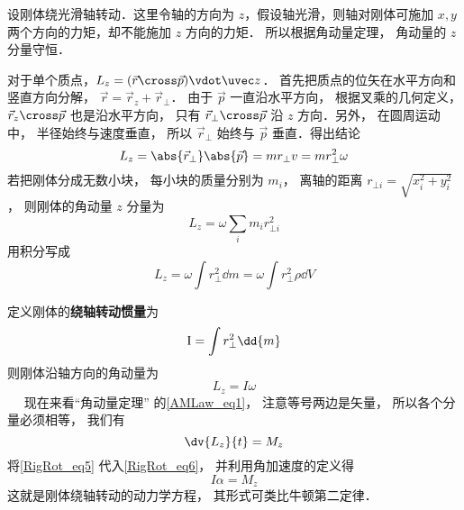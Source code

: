 

设刚体绕光滑轴转动．这里令轴的方向为 $z$，假设轴光滑，则轴对刚体可施加 $x, y$ 两个方向的力矩，却不能施加 $z$ 方向的力矩． 所以根据角动量定理， 角动量的 $z$ 分量守恒．

对于单个质点，$L_z = ( \vec r \cross \vec p ) \vdot \uvec z$． 首先把质点的位矢在水平方向和竖直方向分解， $\vec r = {\vec r_z} + {\vec r_ \bot }$． 由于 $\vec p$ 一直沿水平方向， 根据叉乘的几何定义， ${\vec r_z} \cross \vec p$ 也是沿水平方向， 只有 ${\vec r_ \bot } \cross \vec p$ 沿 $z$ 方向．另外， 在圆周运动中， 半径始终与速度垂直， 所以 ${\vec r_ \bot }$ 始终与 $\vec p$ 垂直．得出结论
\begin{equation}
{L_z} = \abs{\vec r_\bot} \abs{\vec p} = m {r_ \bot } v = mr_ \bot ^2\omega 
\end{equation}
若把刚体分成无数小块， 每小块的质量分别为 $m_i$， 离轴的距离 $r_{\bot i} = \sqrt {x_i^2 + y_i^2} $， 则刚体的角动量 $z$ 分量为
\begin{equation}
L_z = \omega \sum_i m_i r_{ \bot i}^2
\end{equation}
用积分写成
\begin{equation}
{L_z} = \omega \int r_ \bot ^2 \dd{m} = \omega \int r_ \bot ^2\rho  \dd{V} 
\end{equation}

定义刚体的\textbf{绕轴转动惯量}为
\begin{equation}
{\rm{I}} = \int r_ \bot ^2 \dd{m} 
\end{equation}
则刚体沿轴方向的角动量为
\begin{equation}\label{RigRot_eq5}
{L_z} = I\omega 
\end{equation}
 
现在来看“角动量定理” 的\autoref{AMLaw_eq1}， 注意等号两边是矢量， 所以各个分量必须相等， 我们有
\begin{equation}\label{RigRot_eq6}
\dv{L_z}{t} = M_z
\end{equation}
将\autoref{RigRot_eq5} 代入\autoref{RigRot_eq6}， 并利用角加速度的定义得
\begin{equation}
I\alpha = M_z
\end{equation}
这就是刚体绕轴转动的动力学方程， 其形式可类比牛顿第二定律．











